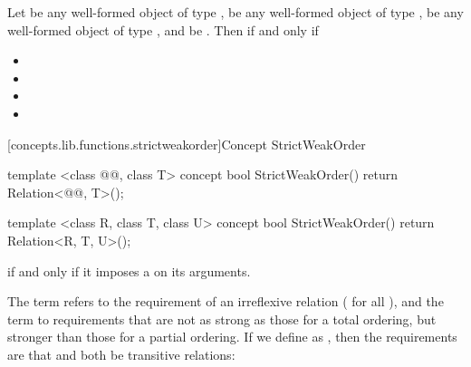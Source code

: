 \begin{addedblock}
\begin{itemdescr}
\pnum
Let  be any well-formed object of type ,  be any well-formed object of
type ,  be any well-formed object of type , and  be
. Then 
  if and only if

\begin{itemize}
\item {}
\item {}
\item {}
\item {}
\end{itemize}
\end{itemdescr}

[concepts.lib.functions.strictweakorder]{Concept StrictWeakOrder}

%
\begin{itemdecl}
template <class @@, class T>
concept bool StrictWeakOrder() {
  return Relation<@@, T>();
}

template <class R, class T, class U>
concept bool StrictWeakOrder() {
  return Relation<R, T, U>();
}
\end{itemdecl}

\begin{itemdescr}
\pnum
{}   if and only if
it imposes a  on its arguments.


{\color{black}
\pnum
The term
refers to the
requirement of an irreflexive relation ( for all ),
and the term
to requirements that are not as strong as
those for a total ordering,
but stronger than those for a partial
ordering.
If we define
as
,
then the requirements are that
and
both be transitive  relations:

}
\end{itemdescr}
\end{addedblock}
